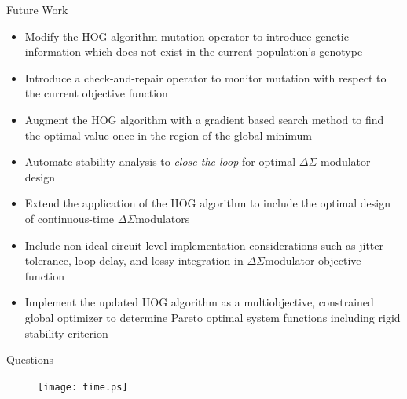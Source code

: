 \documentclass[
	style=aggie,
	mode=present,
	size=10pt,
	paper=screen,
	orient=landscape,
	display=slides,
]{powerdot}
\newcommand{\DS}		{$\Delta\Sigma$\space}
\begin{document}
\begin{slide}[toc=Future Work,bm=Future Work]{Future Work}
	\vfill
	\begin{small}
	\begin{itemize}[type=1]
		\vfill
		\item Modify the HOG algorithm mutation operator to introduce genetic information
			which does not exist in the current population's genotype \pause
		\vfill
		\item Introduce a check-and-repair operator to monitor mutation with respect to 
			the current objective function \pause
		\vfill
		\item Augment the HOG algorithm with a gradient based search method to find the
			optimal value once in the region of the global minimum \pause
		\vfill
		\item Automate stability analysis to \textit{close the loop} for optimal \DS
		modulator design \pause
		\vfill	
		\item Extend the application of the HOG algorithm to include the optimal design of
		continuous-time \DS modulators \pause
		\vfill
		\item Include non-ideal circuit level implementation considerations such as jitter
		tolerance, loop delay, and lossy integration in \DS modulator objective function
		\pause
		\vfill
		\item Implement the updated HOG algorithm as a multiobjective, constrained global
		optimizer to determine Pareto optimal system functions including rigid stability
		criterion
	\end{itemize}
	\end{small}
	\vfill \strut
\end{slide}

\begin{slide}[toc=,bm=]{Questions}
\vfill
\begin{figure}[htbp]
 \centering
 \texttt{[image: time.ps]}
 \vfill \strut
\end{figure}

\end{slide}
\end{document}
